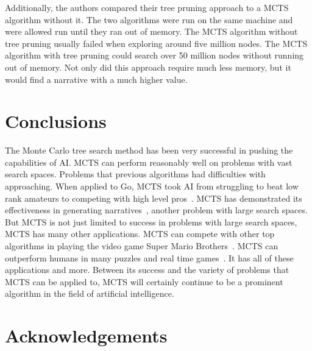 \documentclass{sig-alternate}
\begin{document}
Additionally, the authors compared their tree pruning approach to a MCTS algorithm without it. The two algorithms were run on the same machine and were allowed run until they ran out of memory. The MCTS algorithm without tree pruning usually failed when exploring around five million nodes. The MCTS  algorithm with tree pruning could search over 50 million nodes without running out of memory. Not only did this approach require much less memory, but it would find a narrative with a much higher value.

\section{Conclusions}
The Monte Carlo tree search method has been very successful in pushing the capabilities of AI. MCTS can perform reasonably well on problems with vast search spaces. Problems that previous algorithms had difficulties with approaching. When applied to Go, MCTS took AI from struggling to beat low rank amateurs to competing with high level pros~\cite{TheGrandChallenge}. MCTS has demonstrated its effectiveness in generating narratives~\cite{TheGrandChallenge}, another problem with large search spaces. But MCTS is not just limited to success in problems with large search spaces, MCTS has many other applications. MCTS can compete with other top algorithms in playing the video game Super Mario Brothers~\cite{Jacobsen:2014}. MCTS can outperform humans in many puzzles and real time games~\cite{Narrative}. It has all of these applications and more. Between its success and the variety of problems that MCTS can be applied to, MCTS will certainly continue to be a prominent algorithm in the field of artificial intelligence.

\section{Acknowledgements}


  
\end{document}
